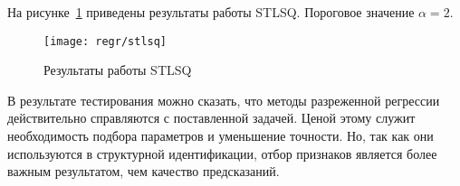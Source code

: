 На рисунке~\ref{fig:regr:stlsq} приведены результаты работы STLSQ. Пороговое значение $\alpha = 2$.

\begin{figure}
\texttt{[image: regr/stlsq]}
\caption{Результаты работы STLSQ}
\label{fig:regr:stlsq}
\end{figure}

В результате тестирования можно сказать, что методы разреженной регрессии действительно справляются с поставленной задачей. Ценой этому служит необходимость подбора параметров и уменьшение точности. Но, так как они используются в структурной идентификации, отбор признаков является более важным результатом, чем качество предсказаний.
